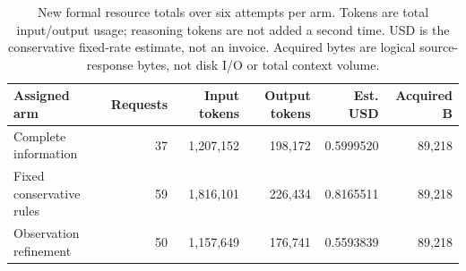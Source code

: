 \begin{table}[tbp]
\centering\small
\setlength{\tabcolsep}{4.5pt}
\caption{New formal resource totals over six attempts per arm. Tokens are total input/output usage; reasoning tokens are not added a second time. USD is the conservative fixed-rate estimate, not an invoice. Acquired bytes are logical source-response bytes, not disk I/O or total context volume.}
\label{tab:abc-costs}
\begin{tabular}{lrrrrr}
\toprule
Assigned arm & Requests & Input tokens & Output tokens & Est. USD & Acquired B \\
\midrule
Complete information & 37 & 1,207,152 & 198,172 & 0.5999520 & 89,218 \\
Fixed conservative rules & 59 & 1,816,101 & 226,434 & 0.8165511 & 89,218 \\
Observation refinement & 50 & 1,157,649 & 176,741 & 0.5593839 & 89,218 \\
\bottomrule
\end{tabular}
\end{table}
